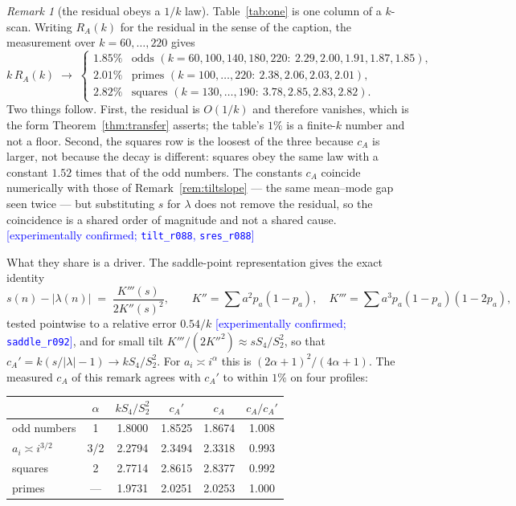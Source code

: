 \documentclass[11pt,a4paper]{article}
\theoremstyle{plain}
\theoremstyle{definition}
\theoremstyle{remark}
\newtheorem{remark}[theorem]{Remark}
\newcommand{\STATUS}[1]{\textcolor{blue}{\textsf{[#1]}}}
\begin{document}
\begin{remark}[the residual obeys a $1/k$ law]\label{rem:onek}
Table~\ref{tab:one} is one column of a $k$-scan. Writing $R_A(k)$ for the residual in the
sense of the caption, the measurement over $k=60,\dots,220$ gives
\[
   k\,R_A(k)\;\longrightarrow\;
   \begin{cases}
     1.85\% & \text{odds } (k=60,100,140,180,220:\ 2.29,2.00,1.91,1.87,1.85),\\
     2.01\% & \text{primes } (k=100,\dots,220:\ 2.38,2.06,2.03,2.01),\\
     2.82\% & \text{squares } (k=130,\dots,190:\ 3.78,2.85,2.83,2.82).
   \end{cases}
\]
Two things follow. First, the residual is $O(1/k)$ and therefore vanishes, which is the form
Theorem~\ref{thm:transfer} asserts; the table's $1\%$ is a finite-$k$ number and not a floor.
Second, the squares row is the loosest of the three because $c_A$ is larger, not because the
decay is different: squares obey the same law with a constant $1.52$ times that of the odd
numbers. The constants $c_A$ coincide numerically with those of
Remark~\ref{rem:tiltslope} --- the same mean--mode gap seen twice --- but substituting $s$ for
$\lambda$ does not remove the residual, so the coincidence is a shared order of magnitude and
not a shared cause. \STATUS{experimentally confirmed; \texttt{tilt\_r088}, \texttt{sres\_r088}}

What they share is a driver. The saddle-point representation gives the exact identity
\[
  s(n)-|\lambda(n)|\;=\;\frac{K'''(s)}{2K''(s)^{2}},
  \qquad K''=\sum a^{2}p_a(1-p_a),\quad K'''=\sum a^{3}p_a(1-p_a)(1-2p_a),
\]
tested pointwise to a relative error $0.54/k$ \STATUS{experimentally confirmed;
\texttt{saddle\_r092}}, and for small tilt $K'''/(2K''^{2})\approx sS_4/S_2^{2}$, so that
$c_A'=k(s/|\lambda|-1)\to kS_4/S_2^{2}$. For $a_i\asymp i^{\alpha}$ this is
$(2\alpha+1)^{2}/(4\alpha+1)$. The measured $c_A$ of this remark agrees with $c_A'$ to within
$1\%$ on four profiles:

\begin{center}
\begin{tabular}{lccccc}
\toprule
 & $\alpha$ & $kS_4/S_2^2$ & $c_A'$ & $c_A$ & $c_A/c_A'$\\
\midrule
odd numbers & 1 & 1.8000 & 1.8525 & 1.8674 & 1.008\\
$a_i\asymp i^{3/2}$ & 3/2 & 2.2794 & 2.3494 & 2.3318 & 0.993\\
squares & 2 & 2.7714 & 2.8615 & 2.8377 & 0.992\\
primes & --- & 1.9731 & 2.0251 & 2.0253 & 1.000\\
\bottomrule
\end{tabular}
\end{center}


\end{remark}
\end{document}
